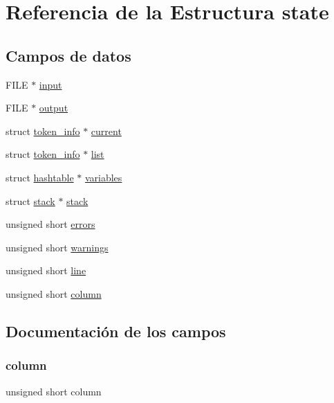 \hypertarget{structstate}{}\section{Referencia de la Estructura state}
\label{structstate}
\subsection*{Campos de datos}
\begin{DoxyCompactItemize}
\item 
F\+I\+LE $\ast$ \mbox{\hyperlink{structstate_abfae665d56d61e1c21831bec369abd34}{input}}
\item 
F\+I\+LE $\ast$ \mbox{\hyperlink{structstate_ab41bf19330e50c3c7bf3544c53f30971}{output}}
\item 
struct \mbox{\hyperlink{structtoken__info}{token\+\_\+info}} $\ast$ \mbox{\hyperlink{structstate_a825c85b4ca3062c1b9eddfb7c7db51e8}{current}}
\item 
struct \mbox{\hyperlink{structtoken__info}{token\+\_\+info}} $\ast$ \mbox{\hyperlink{structstate_ae1283cface726b16d3b16bbbf0a702ee}{list}}
\item 
struct \mbox{\hyperlink{structhashtable}{hashtable}} $\ast$ \mbox{\hyperlink{structstate_a7e36c2490492a4c09cbe8a6ef51c5a95}{variables}}
\item 
struct \mbox{\hyperlink{structstack}{stack}} $\ast$ \mbox{\hyperlink{structstate_a3fdd23f2fd4b006bb7e38f0b39956c44}{stack}}
\item 
unsigned short \mbox{\hyperlink{structstate_a2ff1e8f5aaf49121a59c84adb687936c}{errors}}
\item 
unsigned short \mbox{\hyperlink{structstate_a8f15148e128309c287fada7b1fa5090c}{warnings}}
\item 
unsigned short \mbox{\hyperlink{structstate_a12da61ba70beb7fda26fb3c1703b7b12}{line}}
\item 
unsigned short \mbox{\hyperlink{structstate_aa711ac8c1fc3d2cc6a64e13bda8993f4}{column}}
\end{DoxyCompactItemize}


\subsection{Documentación de los campos}
\mbox{\label{structstate_aa711ac8c1fc3d2cc6a64e13bda8993f4}} 
\subsubsection{\texorpdfstring{column}{column}}
{\footnotesize\ttfamily unsigned short column}

